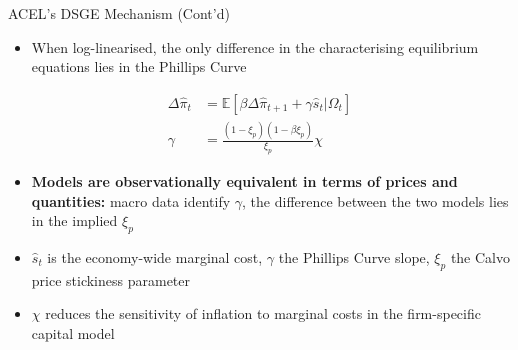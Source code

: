 \documentclass[11pt]{beamer}
\begin{document}

\begin{frame}{ACEL's DSGE Mechanism (Cont'd)}
\begin{itemize}
    \item When log-linearised, the only difference in the characterising equilibrium equations lies in the Phillips Curve
\end{itemize}

\begin{align}
    \Delta\hat{\pi}_t &= \mathbb{E} [\beta\Delta\hat{\pi}_{t+1} + \gamma\hat{s}_t|\Omega_t]
    \label{eq:Phillips_Curve}
    \\
    \gamma &= \frac{(1-\xi_p)(1-\beta\xi_p)}{\xi_p}\chi
    \label{eq:Phillips_Curve_Slope}
\end{align}

\begin{itemize}
    \item \textbf{Models are observationally equivalent in terms of prices and quantities:} \textcolor{PadovaRed}{macro data identify $\gamma$, the difference between the two models lies in the implied $\xi_p$}
    \item {\small $\hat{s}_t$ is the economy-wide marginal cost, $\gamma$ the Phillips Curve slope, $\xi_p$ the Calvo price stickiness parameter}
    \item {\small $\chi$ reduces the sensitivity of inflation to marginal costs in the firm-specific capital model}
\end{itemize}
\end{frame}

\end{document}
